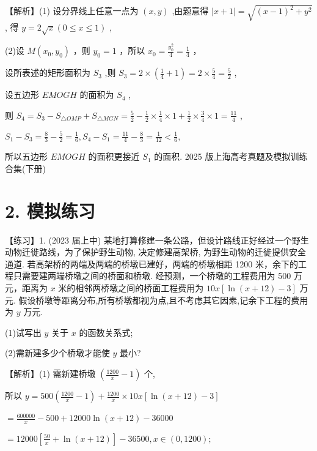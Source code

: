 \documentclass[10pt]{article}
\begin{document}
【解析】(1) 设分界线上任意一点为 \(\left( {x,y}\right)\) ,由题意得 \(\left| {x + 1}\right|  = \sqrt{{\left( x - 1\right) }^{2} + {y}^{2}}\) , 得 \(y = 2\sqrt{x}\left( {0 \leq  x \leq  1}\right)\) ,

(2)设 \(M\left( {{x}_{0},{y}_{0}}\right)\) ，则 \({y}_{0} = 1\) ，所以 \({x}_{0} = \frac{{y}_{0}^{2}}{4} = \frac{1}{4}\) ，

设所表述的矩形面积为 \({S}_{3}\) ,则 \({S}_{3} = 2 \times  \left( {\frac{1}{4} + 1}\right)  = 2 \times  \frac{5}{4} = \frac{5}{2}\) ,

设五边形 \({EMOGH}\) 的面积为 \({S}_{4}\) ,

则 \({S}_{4} = {S}_{3} - {S}_{\bigtriangleup {OMP}} + {S}_{\bigtriangleup {MGN}} = \frac{5}{2} - \frac{1}{2} \times  \frac{1}{4} \times  1 + \frac{1}{2} \times  \frac{3}{4} \times  1 = \frac{11}{4}\) ,

\({S}_{1} - {S}_{3} = \frac{8}{3} - \frac{5}{2} = \frac{1}{6},{S}_{4} - {S}_{1} = \frac{11}{4} - \frac{8}{3} = \frac{1}{12} < \frac{1}{6},\)

所以五边形 \({EMOGH}\) 的面积更接近 \({S}_{1}\) 的面积. 2025 版上海高考真题及模拟训练合集(下册)

\section*{2. 模拟练习}

【练习】1. (2023 届上中) 某地打算修建一条公路，但设计路线正好经过一个野生动物迁徙路线，为了保护野生动物, 决定修建高架桥, 为野生动物的迁徙提供安全通道. 若高架桥的两端及两端的桥墩已建好，两端的桥墩相距 1200 米，余下的工程只需要建两端桥墩之间的桥面和桥墩. 经预测，一个桥墩的工程费用为 500 万元，距离为 \(x\) 米的相邻两桥墩之间的桥面工程费用为 \({10x}\left\lbrack  {\ln \left( {x + {12}}\right)  - 3}\right\rbrack\) 万元. 假设桥墩等距离分布,所有桥墩都视为点,且不考虑其它因素,记余下工程的费用为 \(y\) 万元.

(1)试写出 \(y\) 关于 \(x\) 的函数关系式;

(2)需新建多少个桥墩才能使 \(y\) 最小?

【解析】(1) 需新建桥墩 \(\left( {\frac{1200}{x} - 1}\right)\) 个,

所以 \(y = {500}\left( {\frac{1200}{x} - 1}\right)  + \frac{1200}{x} \times  {10x}\left\lbrack  {\ln \left( {x + {12}}\right)  - 3}\right\rbrack\)

\(= \frac{600000}{x} - {500} + {12000}\ln \left( {x + {12}}\right)  - {36000}\)

\(= {12000}\left\lbrack  {\frac{50}{x} + \ln \left( {x + {12}}\right) }\right\rbrack   - {36500},x \in  \left( {0,{1200}}\right) ;\)
\end{document}
